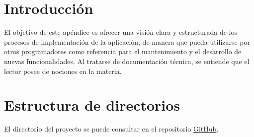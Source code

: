 
\section{Introducción}

El objetivo de este apéndice es ofrecer una visión clara y estructurada de los procesos de implementación de la
aplicación, de manera que pueda utilizarse por otros programadores como referencia para el mantenimiento y
el desarrollo de nuevas funcionalidades.
Al tratarse de documentación técnica, se entiende que el lector posee de nociones en la materia.


\section{Estructura de directorios}

El directorio del proyecto se puede consultar en el repositorio \href{https://github.com/rmg1008/GCA}{GitHub}.


